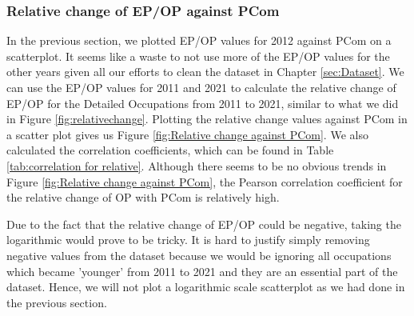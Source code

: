 \documentclass[11pt]{article}
\begin{document}
\subsubsection*{Relative change of EP/OP against PCom}
In the previous section, we plotted EP/OP values for 2012 against PCom on a scatterplot. It seems like a waste to not use more of the EP/OP values for the other years given all our efforts to clean the dataset in Chapter \ref{sec:Dataset}. We can use the EP/OP values for 2011 and 2021 to calculate the relative change of EP/OP for the Detailed Occupations from 2011 to 2021, similar to what we did in Figure \ref{fig:relativechange}. Plotting the relative change values against PCom in a scatter plot gives us Figure \ref{fig:Relative change against PCom}. We also calculated the correlation coefficients, which can be found in Table \ref{tab:correlation for relative}. Although there seems to be no obvious trends in Figure \ref{fig:Relative change against PCom}, the Pearson correlation coefficient for the relative change of OP with PCom is relatively high.

Due to the fact that the relative change of EP/OP could be negative, taking the logarithmic would prove to be tricky. It is hard to justify simply removing negative values from the dataset because we would be ignoring all occupations which became 'younger' from 2011 to 2021 and they are an essential part of the dataset. Hence, we will not plot a logarithmic scale scatterplot as we had done in the previous section.
\end{document}

